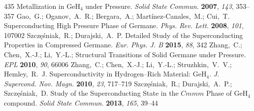 \documentclass[12pt,letterpaper,oneside]{article}
\begin{document}
\begin{mcitethebibliography}{435}
  Metallization in GeH$_4$ under Pressure. \emph{Solid State Commun.}
  \textbf{2007}, \emph{143}, 353--357\relax
\mciteBstWouldAddEndPuncttrue
\mciteSetBstMidEndSepPunct{\mcitedefaultmidpunct}
{\mcitedefaultendpunct}{\mcitedefaultseppunct}\relax
\EndOfBibitem
{}
Gao,~G.; Oganov,~A.~R.; Bergara,~A.; Mart{\'i}nez-Canales,~M.; Cui,~T.
    Superconducting High Pressure Phase of Germane. \emph{Phys.
  Rev. Lett.} \textbf{2008}, \emph{101}, 107002\relax
\mciteBstWouldAddEndPuncttrue
\mciteSetBstMidEndSepPunct{\mcitedefaultmidpunct}
{\mcitedefaultendpunct}{\mcitedefaultseppunct}\relax
\EndOfBibitem
{}
Szcz{\k e}{\'s}niak,~R.; Durajski,~A.~P. Detailed Study of the Superconducting
  Properties in Compressed Germane. \emph{Eur. Phys. J. B} \textbf{2015},
  \emph{88}, 342\relax
\mciteBstWouldAddEndPuncttrue
\mciteSetBstMidEndSepPunct{\mcitedefaultmidpunct}
{\mcitedefaultendpunct}{\mcitedefaultseppunct}\relax
\EndOfBibitem
{}
Zhang,~C.; Chen,~X.-J.; Li,~Y.-L.; 
  Structural Transitions of Solid Germane under Pressure. \emph{EPL}
  \textbf{2010}, \emph{90}, 66006\relax
\mciteBstWouldAddEndPuncttrue
\mciteSetBstMidEndSepPunct{\mcitedefaultmidpunct}
{\mcitedefaultendpunct}{\mcitedefaultseppunct}\relax
\EndOfBibitem
{}
Zhang,~C.; Chen,~X.-J.; Li,~Y.-L.; Struzhkin,~V.~V.; Hemley,~R.~J.
    Superconductivity in Hydrogen--Rich Material: GeH$_4$.
  \emph{J. Supercond. Nov. Magn.} \textbf{2010}, \emph{23}, 717--719\relax
\mciteBstWouldAddEndPuncttrue
\mciteSetBstMidEndSepPunct{\mcitedefaultmidpunct}
{\mcitedefaultendpunct}{\mcitedefaultseppunct}\relax
\EndOfBibitem
{}
Szcz{\k e}{\'s}niak,~R.; Durajski,~A.~P.; Szcz{\k e}{\'s}niak,~D. Study of the
  Superconducting State in the $Cmmm$ Phase of GeH$_4$ compound. \emph{Solid
  State Commun.} \textbf{2013}, \emph{165}, 39--44\relax
\mciteBstWouldAddEndPuncttrue
\mciteSetBstMidEndSepPunct{\mcitedefaultmidpunct}
{\mcitedefaultendpunct}{\mcitedefaultseppunct}\relax
\EndOfBibitem
{}

\end{mcitethebibliography}
\end{document}
